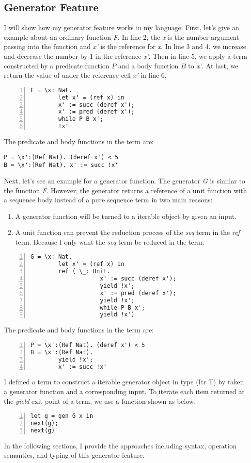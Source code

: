 \subsection{Generator Feature}
I will show how my generator feature works in my language. First, let's give an example about an ordinary function \textit{F}. In line 2, the \textit{x} is the number argument passing into the function and \textit{x'} is the reference for \textit{x}. In line 3 and 4, we increase and decrease the number by 1 in the reference \textit{x'}. Then in line 5, we apply a \while term constructed by a predicate function $P$ and a body function $B$ to \textit{x'}. At last, we return the value of under the reference cell \textit{x'} in line 6.
\begin{lstlisting}[basicstyle=\small, numbers=left]
F = \x: Nat.
		let x' = (ref x) in 
		x' := succ (deref x');
		x' := pred (deref x');
		while P B x';
		!x'
\end{lstlisting}
The predicate and body functions in the \while term are: 
\begin{lstlisting}[basicstyle=\small]
P = \x':(Ref Nat). (deref x') < 5
B = \x':(Ref Nat). x' := succ !x'
\end{lstlisting}
Next, let's see an example for a generator function. The generator \textit{G} is similar to the function \textit{F}. However, the generator returns a reference of a unit function with a sequence body instead of a pure sequence term in two main reasons:
\begin{enumerate}
	\item A generator function will be turned to a iterable object by given an input.
	\item A unit function can prevent the reduction process of the \textit{seq} term in the \textit{ref} term. Because I only want the \textit{seq} term be reduced in the \nt term. 
\end{enumerate}
\begin{lstlisting}[basicstyle=\small, numbers=left]
G = \x: Nat.
		let x' = (ref x) in 
		ref ( \_: Unit.
					x' := succ (deref x');
					yield !x';
					x' := pred (deref x');
					yield !x';
					while P B x';
					yield !x')
\end{lstlisting}
The predicate and body functions in the \while term are:
\begin{lstlisting}[basicstyle=\small, numbers=left]
P = \x':(Ref Nat). (deref x') < 5
B = \x':(Ref Nat). 
		yield !x'; 
		x' := succ !x'
\end{lstlisting}
I defined a \gen term to construct a iterable generator object in type (Itr T) by taken a generator function and a corresponding input. To iterate each item returned at the \textit{yield} exit point of a 
\gen term, we use a \nt function shown as below.
\begin{lstlisting}[basicstyle=\small, numbers=left]
let g = gen G x in 
next(g);
next(g)
\end{lstlisting}
In the following sections, I provide the approaches including syntax, operation semantics, and typing of this generator feature. 